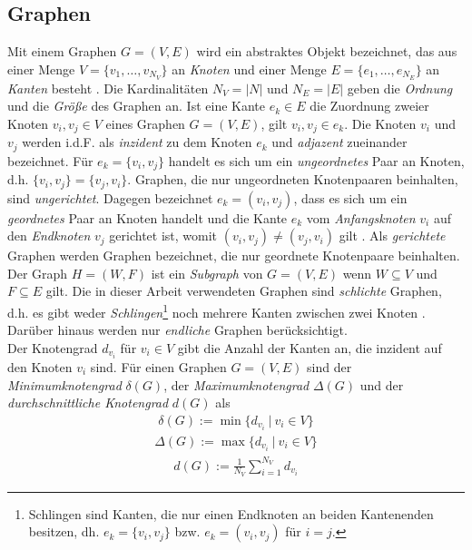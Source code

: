 \documentclass[12pt, a4paper]{report}
\begin{document}
\subsection{Graphen}
Mit einem Graphen $G=(V,E)$ wird ein abstraktes Objekt bezeichnet, das aus einer Menge $V=\{v_1,\dots,v_{N_V}\}$ an \textit{Knoten} und einer Menge $E=\{e_1,\dots,e_{N_E}\}$ an \textit{Kanten} besteht \cite{brandes2005graphfunda}. Die Kardinalitäten $N_V =|N|$ und $N_E=|E|$ geben die \textit{Ordnung} und die \textit{Größe} des Graphen an. Ist eine Kante $e_k \in E$ die Zuordnung zweier Knoten $v_i,v_j \in V$ eines Graphen $G=(V,E)$, gilt ${v_i,v_j} \in e_k$. Die Knoten $v_i$ und $v_j$ werden \mbox{i.d.F.} als \textit{inzident} zu dem Knoten $e_k$ und \textit{adjazent} zueinander bezeichnet. Für $e_k=\{v_i,v_j\}$ handelt es sich um ein \textit{ungeordnetes} Paar an Knoten, d.h. $\{v_i,v_j\}=\{v_j,v_i\}$. Graphen, die nur ungeordneten Knotenpaaren beinhalten, sind \textit{ungerichtet}. Dagegen bezeichnet $e_k=(v_i,v_j)$, dass es sich um ein \textit{geordnetes} Paar an Knoten handelt und die Kante $e_k$ vom \textit{Anfangsknoten} $v_i$ auf den \textit{Endknoten} $v_j$ gerichtet ist, womit $(v_i,v_j) \neq (v_j, v_i)$ gilt \cite{kolaczyk2009statistical}. Als \textit{gerichtete} Graphen werden Graphen bezeichnet, die nur geordnete Knotenpaare beinhalten. Der Graph $H=(W,F)$ ist ein \textit{Subgraph} von $G=(V,E)$ wenn $W \subseteq V$ und $F \subseteq E$ gilt. Die in dieser Arbeit verwendeten Graphen sind \textit{schlichte} Graphen, d.h. es gibt weder \textit{Schlingen}\footnote{ Schlingen sind Kanten, die nur einen Endknoten an beiden Kantenenden besitzen, dh. $e_k=\{v_i,v_j\}$ bzw. $e_k=(v_i,v_j)$ für $i=j$.} noch mehrere Kanten zwischen zwei Knoten \cite{tittmann2011graphen}. Darüber hinaus werden nur \textit{endliche} Graphen berücksichtigt.\\
Der Knotengrad $d_{v_i}$ für $v_i \in V$ gibt die Anzahl der Kanten an, die inzident auf den Knoten $v_i$ sind. Für einen Graphen $G=(V,E)$ sind der \textit{Minimumknotengrad} $\delta(G)$, der \textit{Maximumknotengrad} $\Delta(G)$ und der \textit{durchschnittliche Knotengrad} $d(G)$ als
\begin{align}
\delta(G):=\min\{d_{v_i} \ | \ v_i \in V\}
\end{align}
\begin{align}
\Delta(G):=\max\{d_{v_i} \ | \ v_i \in V\}
\end{align}
\begin{align}
d(G):=\frac{1}{N_V}\sum_{i=1}^{N_V}d_{v_i}
\end{align}
\end{document}
